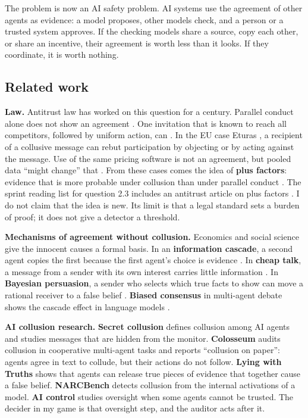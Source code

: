 \documentclass[11pt]{article}
\begin{document}
The problem is now an AI safety problem. AI systems use the agreement of other agents as evidence: a model proposes, other models check, and a person or a trusted system approves. If the checking models share a source, copy each other, or share an incentive, their agreement is worth less than it looks. If they coordinate, it is worth nothing.

\subsection{Related work}
\label{sec:1.3}

\textbf{Law.} Antitrust law has worked on this question for a century. Parallel conduct alone does not show an agreement \citep{S40}. One invitation that is known to reach all competitors, followed by uniform action, can \citep{S41}. In the EU case Eturas \citep{S42}, a recipient of a collusive message can rebut participation by objecting or by acting against the message. Use of the same pricing software is not an agreement, but pooled data ``might change'' that \citep{S46}. From these cases comes the idea of \textbf{plus factors}: evidence that is more probable under collusion than under parallel conduct \citep{S2}. The sprint reading list for question 2.3 includes an antitrust article on plus factors \citep{S2}. I do not claim that the idea is new. Its limit is that a legal standard sets a burden of proof; it does not give a detector a threshold.

\textbf{Mechanisms of agreement without collusion.} Economics and social science give the innocent causes a formal basis. In an \textbf{information cascade}, a second agent copies the first because the first agent's choice is evidence \citep{R6}. In \textbf{cheap talk}, a message from a sender with its own interest carries little information \citep{R7}. In \textbf{Bayesian persuasion}, a sender who selects which true facts to show can move a rational receiver to a false belief \citep{R8}. \textbf{Biased consensus} in multi-agent debate shows the cascade effect in language models \citep{R15}.

\textbf{AI collusion research.} \textbf{Secret collusion} \citep{R12} defines collusion among AI agents and studies messages that are hidden from the monitor. \textbf{Colosseum} \citep{S1} audits collusion in cooperative multi-agent tasks and reports ``collusion on paper'': agents agree in text to collude, but their actions do not follow. \textbf{Lying with Truths} \citep{R14} shows that agents can release true pieces of evidence that together cause a false belief. \textbf{NARCBench} \citep{R17} detects collusion from the internal activations of a model. \textbf{AI control} \citep{R11} studies oversight when some agents cannot be trusted. The decider in my game is that oversight step, and the auditor acts after it.
\end{document}
